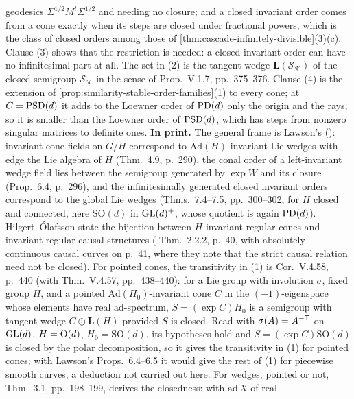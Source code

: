 \begin{theorem}
{geodesics $\Sigma^{1/2}M^t\Sigma^{1/2}$ and needing no closure; and a closed invariant order comes from a
cone exactly when its steps are closed under fractional powers, which is the class of closed
orders among those of \ref{thm:cascade-infinitely-divisible}(3)(c). Clause (3) shows that the restriction is needed: a closed
invariant order can have no infinitesimal part at all. The set in (2) is the tangent wedge
$\mathbf L(\mathcal S_{\mathcal K})$ of the closed semigroup $\mathcal S_{\mathcal K}$ in the sense of
 Prop.~V.1.7, pp.~375--376. Clause (4) is the extension of
\ref{prop:similarity-stable-order-families}(1) to every cone; at $C = \mathrm{PSD}(d)$ it adds to the Loewner
order of $\mathrm{PD}(d)$ only the origin and the rays, so it is smaller than the Loewner order of $\mathrm{PSD}(d)$,
which has steps from nonzero singular matrices to definite ones. \textbf{In print.} The general frame is
Lawson's (): invariant cone fields on $G/H$ correspond to $\mathrm{Ad}(H)$-invariant
Lie wedges with edge the Lie algebra of $H$ (Thm.~4.9, p.~290), the conal order of a left-invariant wedge
field lies between the semigroup generated by $\exp W$ and its closure (Prop.~6.4, p.~296), and the
infinitesimally generated closed invariant orders correspond to the global Lie wedges (Thms.~7.4--7.5,
pp.~300--302, for $H$ closed and connected, here $\mathrm{SO}(d)$ in $\mathrm{GL}(d)^+$, whose quotient is again
$\mathrm{PD}(d)$). Hilgert--Ólafsson state the bijection between $H$-invariant regular cones and invariant regular
causal structures ( Thm.~2.2.2, p.~40, with absolutely continuous causal curves on
p.~41, where they note that the strict causal relation need not be closed). For pointed cones, the
transitivity in (1) is  Cor.~V.4.58, p.~440 (with Thm.~V.4.57, pp.~438--440): for a
Lie group with involution $\sigma$, fixed group $H$, and a pointed $\mathrm{Ad}(H_0)$-invariant cone $C$ in the
$(-1)$-eigenspace whose elements have real $\mathrm{ad}$-spectrum, $S = (\exp C)H_0$ is a semigroup with
tangent wedge $C \oplus \mathbf L(H)$ provided $S$ is closed. Read with $\sigma(A) = A^{-\mathsf{T}}$ on $\mathrm{GL}(d)$,
$H = \mathrm{O}(d)$, $H_0 = \mathrm{SO}(d)$, its hypotheses hold and $S = (\exp C)\mathrm{SO}(d)$ is closed by the
polar decomposition, so it gives the transitivity in (1) for pointed cones; with Lawson's Props.~6.4--6.5
it would give the rest of (1) for piecewise smooth curves, a deduction not carried out here. For wedges, pointed
or not,  Thm.~3.1, pp.~198--199, derives the closedness: with $\mathrm{ad}\,X$ of real
}
\end{theorem}
